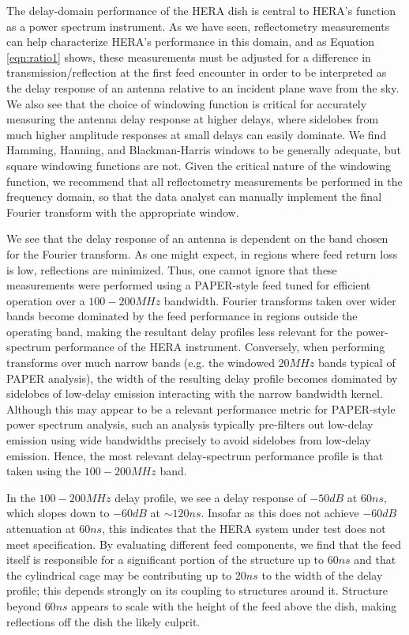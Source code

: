 \documentclass[12pt,preprint]{aastex}
\begin{document}
The delay-domain performance of the HERA dish is central to HERA's function as a power spectrum instrument.
As we have seen, reflectometry measurements can help characterize HERA's performance in this domain, and
as Equation \ref{eqn:ratio1} shows, these measurements must be adjusted for a difference in transmission/reflection
at the first feed encounter in order to be interpreted as the delay response of an antenna relative to an incident
plane wave from the sky.  We also see that the choice of windowing function is critical for accurately measuring the
antenna delay response at higher delays, where sidelobes from much higher amplitude responses at small delays can easily
dominate.  We find Hamming, Hanning, and Blackman-Harris windows to be generally adequate, but square windowing functions are not.
Given the critical nature of the windowing function, we recommend that all reflectometry measurements be performed in the
frequency domain, so that the data analyst can manually implement the final Fourier transform with the appropriate window.

We see that the delay response of an antenna is dependent on the band chosen for the Fourier transform.  As one might expect, in regions
where feed return loss is low, reflections are minimized.  Thus, one cannot ignore that these measurements were performed
using a PAPER-style feed tuned for efficient operation over a $100-200MHz$ bandwidth.  Fourier transforms taken over wider bands
become dominated by the feed performance in regions outside the operating band, making the resultant delay profiles less relevant
for the power-spectrum performance of the HERA instrument.  Conversely, when performing transforms over much 
narrow bands (e.g. the windowed $20MHz$ bands typical of PAPER analysis), the width of the resulting delay profile
becomes dominated by sidelobes of low-delay emission interacting with the narrow bandwidth kernel.  
Although this may appear to be a relevant performance metric
for PAPER-style power spectrum analysis, such an analysis typically pre-filters out low-delay emission using wide bandwidths precisely to avoid
sidelobes from low-delay emission.  Hence, the most relevant delay-spectrum performance profile is that taken using the $100-200MHz$ band.

In the $100-200MHz$ delay profile, we see a delay response of $-50dB$ at $60ns$, which slopes down to $-60dB$ at $\sim120ns$.  Insofar as
this does not achieve $-60dB$ attenuation at $60ns$, this indicates that the HERA system under test does not meet specification.  By evaluating
different feed components, we find that the feed itself is responsible for a significant portion of the structure up to $60ns$ and
that the cylindrical cage may be contributing up to $20ns$ to the width of the delay profile; this depends strongly
on its coupling to structures around it. Structure beyond $60ns$ appears to scale
with the height of the feed above the dish, making reflections off the dish the likely culprit.
\end{document}
